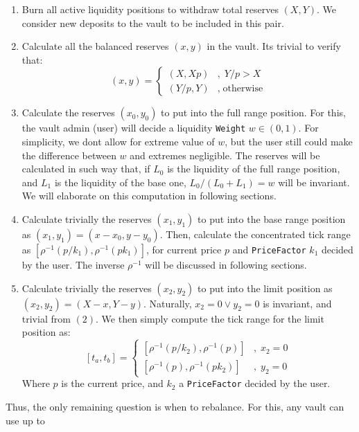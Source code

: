\documentclass[11pt]{article}
\begin{document}
\begin{enumerate}
    \item Burn all active liquidity positions to withdraw total reserves $(X, Y)$.
        We consider new deposits to the vault to be included in this pair.
    \item Calculate all the balanced reserves $(x, y)$ in the vault. Its trivial
        to verify that:
        $$
        (x, y) = \begin{cases}
            (X, Xp) &,\; Y/p > X\\
            (Y/p, Y) &,\; \text{otherwise}
        \end{cases}
        $$
    \item Calculate the reserves $(x_0, y_0)$ to put into the full range position.
        For this, the vault admin (user) will decide a liquidity
        \texttt{Weight} $w\in(0, 1)$. For simplicity, we dont allow for extreme
        value of $w$, but the user still could make the difference between $w$
        and extremes negligible. The reserves will be calculated in such way
        that, if $L_0$ is the liquidity of the full range position, and $L_1$
        is the liquidity of the base one, $L_0/(L_0 + L_1) = w$ will be
        invariant. We will elaborate on this computation in following sections.
    \item Calculate trivially the reserves $(x_1, y_1)$ to put into the base
        range position as $(x_1, y_1) = (x - x_0, y - y_0)$. Then, calculate
        the concentrated tick range as $[\rho^{-1}(p/k_1), \rho^{-1}(pk_1)]$, for
        current price $p$ and \texttt{PriceFactor} $k_1$ decided by the user.
        The inverse $\rho^{-1}$ will be discussed in following sections.
    \item Calculate trivially the reserves $(x_2, y_2)$ to put into the limit
        position as $(x_2, y_2) = (X - x, Y - y)$. Naturally, $x_2 = 0\lor y_2 = 0$
        is invariant, and trivial from $(2)$. We then simply compute the tick range
        for the limit position as:
        $$
        [t_a, t_b] = \begin{cases}
            [\rho^{-1}(p/k_2), \rho^{-1}(p)] &,\; x_2 = 0\\
            [\rho^{-1}(p), \rho^{-1}(pk_2)] &,\; y_2 = 0
        \end{cases}
        $$
        Where $p$ is the current price, and $k_2$ a \texttt{PriceFactor} decided by the user.
\end{enumerate}
Thus, the only remaining question is when to rebalance. For this, any vault can use up to
\end{document}
